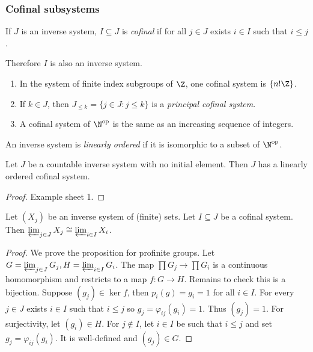 \documentclass[a4paper]{article}
\begin{document}
\subsubsection{Cofinal subsystems}

\begin{definition}[cofinal]
  If \(J\) is an inverse system, \(I \subseteq J\) is \emph{cofinal} if for all \(j \in J\) exists \(i \in I\) such that \(i \leq j\).
\end{definition}
Therefore \(I\) is also an inverse system.

\begin{eg}\leavevmode
  \begin{enumerate}
  \item In the system of finite index subgroups of \(\Z\), one cofinal system is \(\{n! \Z\}\).
  \item If \(k \in J\), then \(J_{\leq k} = \{j \in J: j \leq k\}\) is a \emph{principal cofinal system}.
  \item A cofinal system of \(\N^{\text{op}}\) is the same as an increasing sequence of integers.
  \end{enumerate}
\end{eg}

\begin{definition}
  An inverse system is \emph{linearly ordered} if it is isomorphic to a subset of \(\N^{\text{op}}\).
\end{definition}

\begin{proposition}
  Let \(J\) be a countable inverse system with no initial element. Then \(J\) has a linearly ordered cofinal system.
\end{proposition}

\begin{proof}
  Example sheet 1.
\end{proof}

\begin{proposition}
  Let \((X_j)\) be an inverse system of (finite) sets. Let \(I \subseteq J\) be a cofinal system. Then \(\varprojlim_{j \in J} X_j \cong \varprojlim_{i \in I} X_i\).
\end{proposition}

\begin{proof}
  We prove the proposition for profinite groups. Let \(G = \varprojlim_{j \in J} G_j, H = \varprojlim_{i \in I} G_i\). The map \(\prod G_j \to \prod G_i\) is a continuous homomorphism and restricts to a map \(f: G \to H\). Remains to check this is a bijection. Suppose \((g_j) \in \ker f\), then \(p_i(g) = g_i = 1\) for all \(i \in I\). For every \(j \in J\) exists \(i \in I\) such that \(i \leq j\) so \(g_j = \varphi_{ij}(g_i) = 1\). Thus \((g_j) = 1\). For surjectivity, let \((g_i) \in H\). For \(j \notin I\), let \(i \in I\) be such that \(i \leq j\) and set \(g_j = \varphi_{ij}(g_i)\). It is well-defined and \((g_j) \in G\).
\end{proof}
\end{document}
